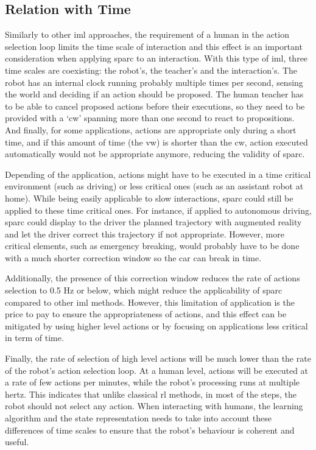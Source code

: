 \subsection{Relation with Time} \label{ssec:sparc_time}
Similarly to other \gls{iml} approaches, the requirement of a human in the action selection loop limits the time scale of interaction and this effect is an important consideration when applying \gls{sparc} to an interaction. With this type of \gls{iml}, three time scales are coexisting: the robot's, the teacher's and the interaction's. The robot has an internal clock running probably multiple times per second, sensing the world and deciding if an action should be proposed. The human teacher has to be able to cancel proposed actions before their executions, so they need to be provided with a `\gls{cw}' spanning more than one second to react to propositions. And finally, for some applications, actions are appropriate only during a short time, and if this amount of time (the \gls{vw}) is shorter than the \gls{cw}, action executed automatically would not be appropriate anymore, reducing the validity of \gls{sparc}.

Depending of the application, actions might have to be executed in a time critical environment (such as driving) or less critical ones (such as an assistant robot at home). While being easily applicable to slow interactions, \gls{sparc} could still be applied to these time critical ones. For instance, if applied to autonomous driving, \gls{sparc} could display to the driver the planned trajectory with augmented reality and let the driver correct this trajectory if not appropriate. However, more critical elements, such as emergency breaking, would probably have to be done with a much shorter correction window so the car can break in time. 

Additionally, the presence of this correction window reduces the rate of actions selection to 0.5 Hz or below, which might reduce the applicability of \gls{sparc} compared to other \gls{iml} methods. However, this limitation of application is the price to pay to ensure the appropriateness of actions, and this effect can be mitigated by using higher level actions or by focusing on applications less critical in term of time. 

Finally, the rate of selection of high level actions will be much lower than the rate of the robot's action selection loop. At a human level, actions will be executed at a rate of few actions per minutes, while the robot's processing runs at multiple hertz. This indicates that unlike classical \gls{rl} methods, in most of the steps, the robot should not select any action. When interacting with humans, the learning algorithm and the state representation needs to take into account these differences of time scales to ensure that the robot's behaviour is coherent and useful.

